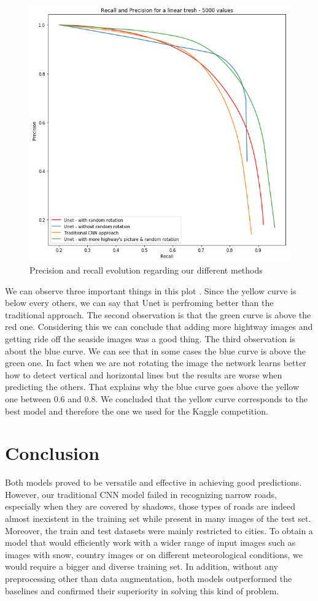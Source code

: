 \documentclass[10pt,conference,compsocconf]{IEEEtran}
\begin{document}
	\begin{figure}[h]
		\centering
		\includegraphics[width=0.8\columnwidth]{img/pr_curve.png}
		\caption{Precision and recall evolution regarding our different methods}
		\label{fig:pr}
	\end{figure}
	
	We can observe three important things in this plot . Since the yellow curve is below every others, we can say that Unet is perfroming better than the traditional approach. The second observation is that the green curve is above the red one. Considering this we can conclude that adding more hightway images and getting ride off the seaside images was a good thing. The third observation is about the blue curve. We can see that in some cases the blue curve is above the green one. In fact when we are not rotating the image the network learns better how to detect vertical and horizontal lines but the results are worse when predicting the others. That explains why the blue curve goes above the yellow one between 0.6 and 0.8. We concluded that the yellow curve corresponds to the best model and therefore the one we used for the Kaggle competition.
	
\section{Conclusion}
\label{sec:conclusion}
Both models proved to be versatile and effective in achieving good predictions. However, our traditional CNN model failed in recognizing narrow roads, especially when they are covered by shadows, those types of roads are indeed almost inexistent in the training set while present in many images of the test set. Moreover, the train and test datasets were mainly restricted to cities. To obtain a model that would efficiently work with a wider range of input images such as images with snow, country images or on different meteorological conditions, we would require a bigger and diverse training set. In addition, without any preprocessing other than data augmentation, both models outperformed the baselines and confirmed their superiority in solving this kind of problem.




\end{document}
